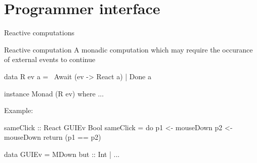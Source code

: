 \documentclass{beamer}
\begin{document}
\section{Programmer interface}

\begin{frame}{Reactive computations}

\begin{block}{Reactive computation}
A monadic computation which may require the occurance of external events to continue
\end{block}

\begin{code}
data R ev a =~ Await (ev -> React a) | Done a

instance Monad (R ev) where ...
\end{code}
Example:
\begin{code}
sameClick :: React GUIEv Bool
sameClick = do  p1 <- mouseDown
                p2 <- mouseDown
                return (p1 == p2)

data GUIEv  =  MDown { but :: Int} 
            |  ...
\end{code}
\end{frame}
\end{document}
